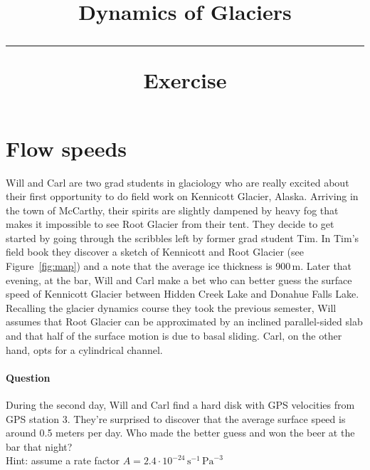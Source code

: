 \documentclass[parskip=half]{scrartcl}
\begin{document}
\vspace{-5em}

\title{Dynamics of Glaciers \\[.2em]
\rule[1em]{\textwidth}{2pt}
\LARGE{\sf Exercise}
}
\date{}

\vspace{-5em}

\maketitle


\vspace{-5em}

\section{Flow speeds}

Will and Carl are two grad students in glaciology who are really excited about their first opportunity to do field work on Kennicott Glacier, Alaska. Arriving in the town of McCarthy, their spirits are slightly dampened by heavy fog that makes it impossible to see Root Glacier from their tent. They decide to get started by going through the scribbles left by former grad student Tim. In Tim's field book they discover a sketch of Kennicott and Root Glacier (see Figure~\ref{fig:map}) and a note that the average ice thickness is 900\,m. Later that evening, at the bar,  Will and Carl make a bet who can better guess the surface speed of Kennicott Glacier between Hidden Creek Lake and Donahue Falls Lake. Recalling the glacier dynamics course they took the previous semester, Will assumes that Root Glacier can be approximated by an inclined parallel-sided slab and that half of the surface motion is due to basal sliding. Carl, on the other hand, opts for a cylindrical channel. 

\paragraph{Question} During the second day, Will and Carl find a hard disk with GPS velocities from GPS station 3. They're surprised to discover that the average surface speed is around 0.5 meters per day. Who made the better guess and won the beer at the bar that night?
\\[1em]
Hint: assume a rate factor $A=2.4\cdot 10^{-24}\,\textrm{s}^{-1}\,\textrm{Pa}^{-3}$
\end{document}
